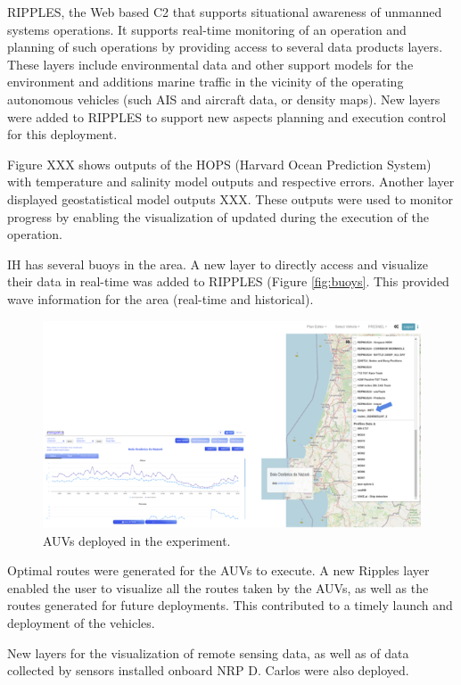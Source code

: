 RIPPLES, the Web based C2 that supports situational awareness of
unmanned systems operations. It supports real-time monitoring of an
operation and planning of such operations by providing access to several
data products layers. These layers include environmental data and other
support models for the environment and additions marine traffic in the
vicinity of the operating autonomous vehicles (such AIS and aircraft
data, or density maps). New layers were added to RIPPLES to support new
aspects planning and execution control for this deployment.

Figure XXX shows outputs of the HOPS (Harvard Ocean Prediction System)
with temperature and salinity model outputs and respective errors.
Another layer displayed geostatistical model outputs XXX. These outputs
were used to monitor progress by enabling the visualization of updated
during the execution of the operation.

IH has several buoys in the area. A new layer to directly access and
visualize their data in real-time was added to RIPPLES (Figure
\ref{fig:buoys}. This provided wave information for the area (real-time
and historical).


\begin{figure}
    \centering
    \includegraphics[width=.7\linewidth]{fig/buoys.png}
    \caption{AUVs deployed in the experiment.}
    \label{fibuoys}
\end{figure}

 
Optimal routes were generated for the AUVs to execute. A new Ripples
layer enabled the user to visualize all the routes taken by the AUVs, as
well as the routes generated for future deployments. This contributed to
a timely launch and deployment of the vehicles.
 
New layers for the visualization of remote sensing data, as well as of
data collected by sensors installed onboard NRP D. Carlos were also
deployed.



